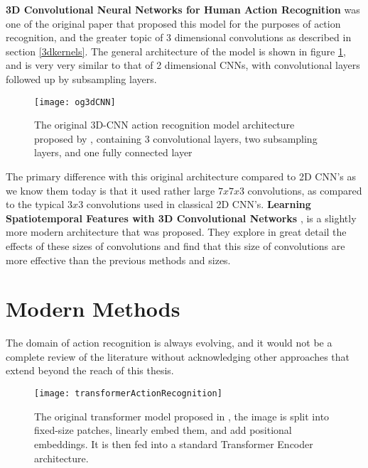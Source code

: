\textbf{3D Convolutional Neural Networks for Human Action Recognition} \cite{3DCNN-ActionRecognition} was one of the original paper that proposed this model for the purposes of action recognition, and the greater topic of 3 dimensional convolutions as described in section \ref{3dkernels}. The general architecture of the model is shown in figure \ref{fig:original3dcnn}, and is very very similar to that of 2 dimensional CNNs, with convolutional layers followed up by subsampling layers.

\begin{figure}[h]
	\texttt{[image: og3dCNN]}
	\centering
	\caption{The original 3D-CNN action recognition model architecture proposed by \cite{3DCNN-ActionRecognition}, containing 3 convolutional layers, two subsampling layers, and one fully connected layer}
	\label{fig:original3dcnn}
\end{figure}

The primary difference with this original architecture compared to 2D CNN's as we know them today is that it used rather large $7x7x3$ convolutions, as compared to the typical $3x3$ convolutions used in classical 2D CNN's. \textbf{Learning Spatiotemporal Features with 3D Convolutional Networks} \cite{3x33dcnn}, is a slightly more modern architecture that was proposed. They explore in great detail the effects of these sizes of convolutions and find that this size of convolutions are more effective than the previous methods and sizes.

\section{Modern Methods}

The domain of action recognition is always evolving, and it would not be a complete review of the literature without acknowledging other approaches that extend beyond the reach of this thesis.

\begin{figure}[h]
	\texttt{[image: transformerActionRecognition]}
	\centering
	\caption{The original transformer model proposed in \cite{transformer_og}, the image is split into fixed-size patches, linearly embed them, and add positional embeddings. It is then fed into a standard Transformer Encoder architecture.}
	\label{fig:transformerActionRecognition}
\end{figure}

